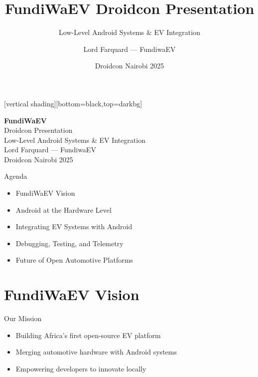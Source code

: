 \documentclass[aspectratio=169]{beamer}
\title{FundiWaEV Droidcon Presentation}
\subtitle{Low-Level Android Systems \& EV Integration}
\author{Lord Farquard — FundiwaEV}
\date{Droidcon Nairobi 2025}
\begin{document}
{
[vertical shading][bottom=black,top=darkbg]
\begin{frame}[plain]
    
    \vspace{2cm}
    \centering
    {\color{terminalgreen}\Huge\bfseries FundiWaEV}\\[0.5cm]
    {\Large Droidcon Presentation}\\[0.3cm]
    {\small Low-Level Android Systems \& EV Integration}\\[1cm]
    {\color{gray}\small Lord Farquard — FundiwaEV}\\[0.2cm]
    {\color{gray}\small Droidcon Nairobi 2025}
\end{frame}
}

\begin{frame}{Agenda}
\begin{itemize}
    \item FundiWaEV Vision
    \item Android at the Hardware Level
    \item Integrating EV Systems with Android
    \item Debugging, Testing, and Telemetry
    \item Future of Open Automotive Platforms
\end{itemize}
\end{frame}

\section{FundiWaEV Vision}
\begin{frame}{Our Mission}
\begin{itemize}
    \item Building Africa’s first open-source EV platform
    \item Merging automotive hardware with Android systems
    \item Empowering developers to innovate locally
\end{itemize}
\end{frame}
\end{document}
